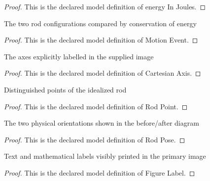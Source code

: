 \begin{proof}
  This is the declared model definition of energy In Joules.
\end{proof}
\begin{definition}
  \label{def:physics:phyx-mini-0699:phyxminiproblems-problemphyxmini0699-motionevent}
  The two rod configurations compared by conservation of energy
\end{definition}
\begin{proof}
  This is the declared model definition of Motion Event.
\end{proof}
\begin{definition}
  \label{def:physics:phyx-mini-0699:phyxminiproblems-problemphyxmini0699-cartesianaxis}
  The axes explicitly labelled in the supplied image
\end{definition}
\begin{proof}
  This is the declared model definition of Cartesian Axis.
\end{proof}
\begin{definition}
  \label{def:physics:phyx-mini-0699:phyxminiproblems-problemphyxmini0699-rodpoint}
  Distinguished points of the idealized rod
\end{definition}
\begin{proof}
  This is the declared model definition of Rod Point.
\end{proof}
\begin{definition}
  \label{def:physics:phyx-mini-0699:phyxminiproblems-problemphyxmini0699-rodpose}
  The two physical orientations shown in the before/after diagram
\end{definition}
\begin{proof}
  This is the declared model definition of Rod Pose.
\end{proof}
\begin{definition}
  \label{def:physics:phyx-mini-0699:phyxminiproblems-problemphyxmini0699-figurelabel}
  Text and mathematical labels visibly printed in the primary image
\end{definition}
\begin{proof}
  This is the declared model definition of Figure Label.
\end{proof}

